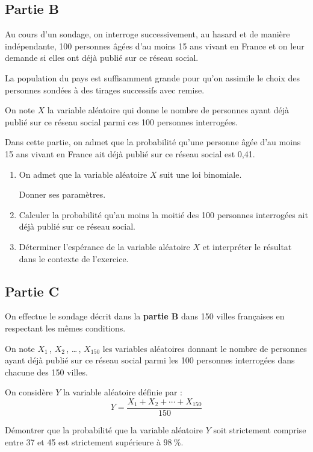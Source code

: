 \documentclass[10pt]{article}
\begin{document}
\subsection*{Partie B}
Au cours d'un sondage, on interroge successivement, au hasard et de manière indépendante, 100 personnes âgées d'au moins 15 ans vivant en France et on leur demande si elles ont déjà publié sur ce réseau social.

La population du pays est suffisamment grande pour qu'on assimile le choix des personnes sondées à des tirages successifs avec remise.

On note $X$ la variable aléatoire qui donne le nombre de personnes ayant déjà publié sur ce réseau social parmi ces 100 personnes interrogées.

Dans cette partie, on admet que la probabilité qu'une personne âgée d'au moins 15 ans vivant en France ait déjà publié sur ce réseau social est 0,41.

\begin{enumerate}
	\item On admet que la variable aléatoire $X$ suit une loi binomiale.

	Donner ses paramètres.

	\item Calculer la probabilité qu'au moins la moitié des 100 personnes interrogées ait déjà publié sur ce réseau social.

	\item Déterminer l'espérance de la variable aléatoire $X$ et interpréter le résultat dans le contexte de l'exercice.
\end{enumerate}

\subsection*{Partie C}
On effectue le sondage décrit dans la \textbf{partie B} dans 150 villes françaises en respectant les mêmes conditions.

On note $X_{1}$\,, $X_{2}$\,, \ldots\,, $X_{150}$ les variables aléatoires donnant le nombre de personnes ayant déjà publié sur ce réseau social parmi les 100 personnes interrogées dans chacune des 150 villes.

On considère $Y$ la variable aléatoire définie par :
\[Y=\dfrac{X_{1}+X_{2}+\cdots+X_{150}}{150}\]

Démontrer que la probabilité que la variable aléatoire $Y$ soit strictement comprise entre 37 et 45 est strictement supérieure à $98~\%$.
\end{document}
